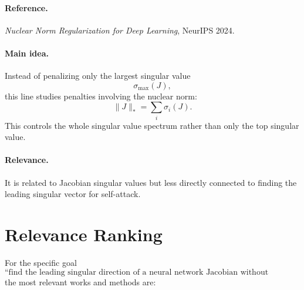\documentclass{article}
\begin{document}
\paragraph{Reference.}
\emph{Nuclear Norm Regularization for Deep Learning}, NeurIPS 2024.

\paragraph{Main idea.}
Instead of penalizing only the largest singular value
\[
\sigma_{\max}(J),
\]
this line studies penalties involving the nuclear norm:
\[
\|J\|_*=\sum_i \sigma_i(J).
\]
This controls the whole singular value spectrum rather than only the top singular value.

\paragraph{Relevance.}
It is related to Jacobian singular values but less directly connected to finding the leading singular vector for self-attack.

\section{Relevance Ranking}

For the specific goal
\[
\text{``find the leading singular direction of a neural network Jacobian without explicitly forming the Jacobian,''}
\]
the most relevant works and methods are:
\end{document}
